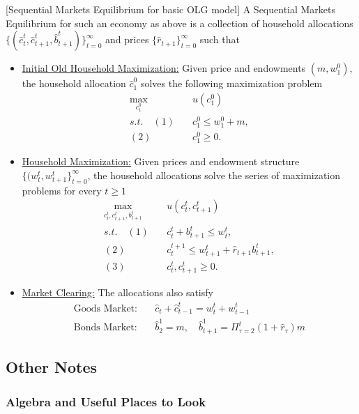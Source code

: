 \documentclass[11pt,english]{article}
\begin{document}
\begin{definition}{[Sequential Markets Equilibrium for basic OLG model]} A Sequential Markets Equilibrium for such an economy as above is a collection of household allocations $\{(\hat{c}_t^t, \hat{c}_{t+1}^t, \hat{b}_{t+1}^t)\}_{t=0}^\infty$ and prices $\{\hat{r}_{t+1}\}_{t=0}^\infty$ such that 
\begin{itemize}
\item \underline{Initial Old Household Maximization:} Given price and endowments $(m, w_1^0)$, the household allocation $\hat{c}_1^0$ solves the following maximization problem
\begin{align*}
\max_{c^0_1}& \quad u(c^0_1)\\
s.t.\quad (1)&\quad c_1^0 \leq w_1^0 + m,\\
(2)&\quad c_1^0 \geq 0.
\end{align*}
\item\underline{Household Maximization:} Given prices and endowment structure $\{(w_t^t, w_{t+1}^t\}_{t=0}^\infty$, the household allocations solve the series of maximization problems for every $t \geq 1$
\begin{align*}
\max_{c^t_t, c_{t+1}^t, b_{t+1}^t}& \quad u(c^t_t, c_{t+1}^t)\\
s.t.\quad (1)&\quad c^t_t + b_{t+1}^t \leq  w^t_t ,\\
(2)&\quad c^{t+1}_t  \leq  w^{t}_{t+1} + \hat{r}_{t+1}b_{t+1}^t ,\\
(3)&\quad c_t^t, c_{t+1}^t \geq 0.
\end{align*}
\item\underline{Market Clearing:} The allocations also satisfy \begin{align*}
\text{Goods Market:}&\quad \hat{c}_t + \hat{c}_{t-1}^t = w_t^t + w_{t-1}^t\\
\text{Bonds Market:}&\quad \hat{b}_2^1 = m,\quad \hat{b}_{t+1}^1 = \Pi_{\tau=2}^t(1 + \hat{r}_{\tau})m
\end{align*}
\end{itemize}
\end{definition}
\subsection{Other Notes}

\subsubsection{Algebra and Useful Places to Look}
\end{document}
